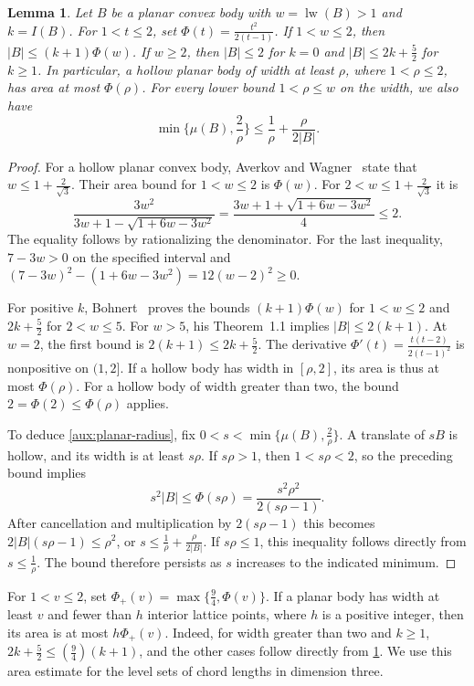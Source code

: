 \documentclass[reqno, 11pt]{article}
\numberwithin{equation}{section}
\newtheorem{lemma}[lemma]{Lemma}
\theoremstyle{definition}
\DeclareMathOperator{\lw}{lw}
\begin{document}
\begin{lemma}\label{aux:planar}
Let $B$ be a planar convex body with $w=\lw(B)>1$ and $k=I(B)$.
For $1<t\le2$, set $\Phi(t)=\frac{t^2}{2(t-1)}$. If $1<w\le2$, then
$|B|\le(k+1)\Phi(w)$. If $w\ge2$, then $|B|\le2$ for $k=0$
and $|B|\le2k+\frac{5}{2}$ for $k\ge1$. In particular, a hollow planar
body of width at least $\rho$, where $1<\rho\le2$, has area at most
$\Phi(\rho)$. For every lower bound $1<\rho\le w$ on the width,
we also have
\begin{equation}\label{aux:planar-radius}
             \min\{\mu(B),\frac{2}{\rho}\}\le \frac{1}{\rho}+\frac{\rho}{2|B|}.
\end{equation}
\end{lemma}

\begin{proof}
For a hollow planar convex body, Averkov and
Wagner~\cite[Theorems~2.1 and~2.2]{AW} state that
$w\le1+\frac{2}{\sqrt3}$. Their area bound for $1<w\le2$ is
$\Phi(w)$. For $2<w\le1+\frac{2}{\sqrt3}$ it is
\[
 \frac{3w^2}{3w+1-\sqrt{1+6w-3w^2}}
 =\frac{3w+1+\sqrt{1+6w-3w^2}}{4}\le 2 .
\]
The equality follows by rationalizing the denominator. For the last
inequality, $7-3w>0$ on the specified interval and
$(7-3w)^2-(1+6w-3w^2)=12(w-2)^2\ge0$.

For positive $k$, Bohnert~\cite[Theorem~1.2]{Bohnert} proves the
bounds $(k+1)\Phi(w)$ for $1<w\le2$ and $2k+\frac{5}{2}$ for
$2<w\le5$. For $w>5$, his Theorem~1.1 implies $|B|\le2(k+1)$.
At $w=2$, the first bound is $2(k+1)\le2k+\frac{5}{2}$.
The derivative
$\Phi'(t)=\frac{t(t-2)}{2(t-1)^2}$ is nonpositive on $(1,2]$.
If a hollow body has width in $[\rho,2]$, its area is thus at most
$\Phi(\rho)$. For a hollow body of width greater than two, the bound
$2=\Phi(2)\le\Phi(\rho)$ applies.

To deduce \eqref{aux:planar-radius}, fix
$0<s<\min\{\mu(B),\frac{2}{\rho}\}$. A translate of $sB$ is hollow,
and its width is at least $s\rho$. If $s\rho>1$, then $1<s\rho<2$,
so the preceding bound implies
\[
 s^2|B|\le\Phi(s\rho)=\frac{s^2\rho^2}{2(s\rho-1)}.
\]
After cancellation and multiplication by $2(s\rho-1)$ this becomes
$2|B|(s\rho-1)\le\rho^2$, or
$s\le\frac{1}{\rho}+\frac{\rho}{2|B|}$. If $s\rho\le1$, this
inequality follows directly from $s\le\frac{1}{\rho}$. The bound
therefore persists as $s$ increases to the indicated minimum.
\end{proof}

For $1<v\le2$, set $\Phi_+(v)=\max\{\frac{9}{4},\Phi(v)\}$. If a planar body
has width at least $v$ and fewer than $h$ interior lattice points,
where $h$ is a positive integer, then its area is at most $h\Phi_+(v)$.
Indeed, for width greater than two and $k\ge1$,
$2k+\frac{5}{2}\le(\frac{9}{4})(k+1)$, and the other cases follow directly from
\cref{aux:planar}. We use this area estimate for the level sets of
chord lengths in dimension three.
\end{document}
